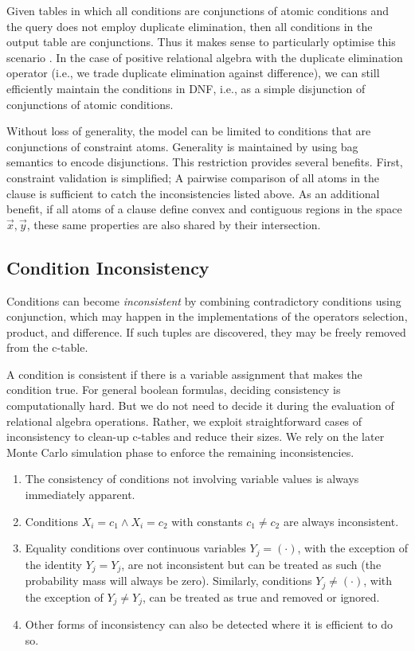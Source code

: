 Given  tables  in which  all  conditions  are  conjunctions of  atomic conditions and  the query does not employ  duplicate elimination, then all conditions  in the output  table are conjunctions.  Thus  it makes sense to particularly optimise this scenario \cite{AJKO2008}. In the case of positive relational algebra  with the duplicate elimination  operator (i.e., we trade  duplicate   elimination  against  difference),   we  can  still efficiently  maintain  the  conditions  in  DNF,  i.e.,  as  a  simple disjunction of conjunctions of atomic conditions.

Without loss of generality, the model can be limited to conditions that are conjunctions of constraint  atoms.  Generality  is maintained by  using bag  semantics to encode disjunctions. This  restriction   provides   several  benefits. First, constraint  validation is  simplified;  A pairwise  comparison of  all atoms in the clause is  sufficient to catch the inconsistencies listed above.   As an additional  benefit, if  all atoms  of a  clause define convex and  contiguous regions in the space $\vec{x},\vec{y}$, these same properties are also shared by their intersection.

\subsection{Condition Inconsistency}
Conditions can become \textit{inconsistent} by combining contradictory conditions using conjunction, which may happen in the implementations of the operators selection, product, and difference.  If such tuples are discovered, they may be freely removed from the c-table.  

A condition is consistent if there is a variable assignment that makes the condition true. For general boolean formulas, deciding consistency is computationally hard. But we do not need to decide it during the evaluation of relational algebra operations.  Rather, we exploit straightforward cases of inconsistency to clean-up c-tables and reduce their sizes. We rely on the later Monte Carlo simulation phase to enforce the remaining inconsistencies.
%
\begin{enumerate}
\item The consistency of conditions not involving variable values is always immediately apparent.
\item Conditions $X_i = c_1 \land X_i = c_2$ with constants $c_1 \neq c_2$ are always inconsistent.
\item Equality conditions over continuous variables $Y_j = (\cdot)$, with the exception of the identity $Y_j = Y_j$, are not inconsistent but can be treated as such (the probability mass will always be zero).  Similarly, conditions $Y_j \neq (\cdot)$, with the exception of $Y_j \neq Y_j$, can be treated as true and removed or ignored.
\item Other forms of inconsistency can also be detected where it is efficient to do so.
\end{enumerate}


